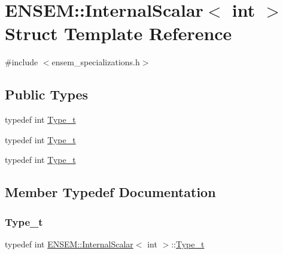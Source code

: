 \hypertarget{structENSEM_1_1InternalScalar_3_01int_01_4}{}\section{E\+N\+S\+EM\+:\+:Internal\+Scalar$<$ int $>$ Struct Template Reference}
\label{structENSEM_1_1InternalScalar_3_01int_01_4}


{\ttfamily \#include $<$ensem\+\_\+specializations.\+h$>$}

\subsection*{Public Types}
\begin{DoxyCompactItemize}
\item 
typedef int \mbox{\hyperlink{structENSEM_1_1InternalScalar_3_01int_01_4_a5814154ceb365d4ebbd319bcace78528}{Type\+\_\+t}}
\item 
typedef int \mbox{\hyperlink{structENSEM_1_1InternalScalar_3_01int_01_4_a5814154ceb365d4ebbd319bcace78528}{Type\+\_\+t}}
\item 
typedef int \mbox{\hyperlink{structENSEM_1_1InternalScalar_3_01int_01_4_a5814154ceb365d4ebbd319bcace78528}{Type\+\_\+t}}
\end{DoxyCompactItemize}


\subsection{Member Typedef Documentation}
\mbox{\label{structENSEM_1_1InternalScalar_3_01int_01_4_a5814154ceb365d4ebbd319bcace78528}} 
\subsubsection{\texorpdfstring{Type\_t}{Type\_t}\hspace{0.1cm}{\footnotesize\ttfamily [1/3]}}
{\footnotesize\ttfamily typedef int \mbox{\hyperlink{structENSEM_1_1InternalScalar}{E\+N\+S\+E\+M\+::\+Internal\+Scalar}}$<$ int $>$\+::\mbox{\hyperlink{structENSEM_1_1InternalScalar_3_01int_01_4_a5814154ceb365d4ebbd319bcace78528}{Type\+\_\+t}}}

\mbox{\label{structENSEM_1_1InternalScalar_3_01int_01_4_a5814154ceb365d4ebbd319bcace78528}} 
